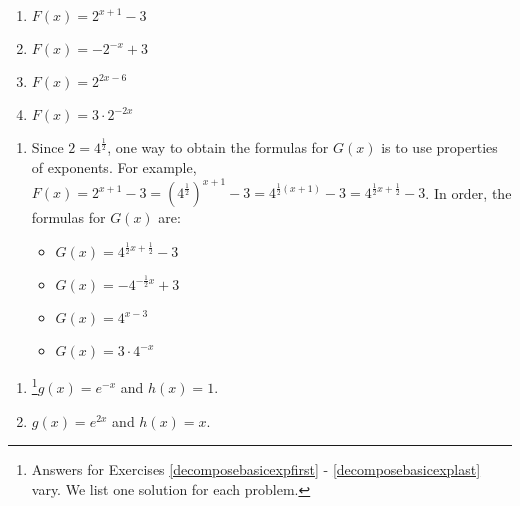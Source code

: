 \documentclass{ximera}
\begin{document}
\begin{multicols}{4}
\begin{enumerate}
\setcounter{enumi}{\value{HW}}

\item $F(x) = 2^{x+1}-3$

\item  $F(x) = -2^{-x} + 3$

\item $F(x) = 2^{2x-6}$

\item  $F(x) =3 \cdot 2^{-2x}$

\setcounter{HW}{\value{enumi}}
\end{enumerate}
\end{multicols}

\begin{enumerate}
\setcounter{enumi}{\value{HW}}

\item  Since $2 = 4^{\frac{1}{2}}$, one way to obtain the formulas for $G(x)$ is to use properties of exponents.  For example, $F(x) = 2^{x+1}-3 = \left(4^{\frac{1}{2}}\right)^{x+1} -3 = 4^{\frac{1}{2}(x+1)} - 3 = 4^{\frac{1}{2} x + \frac{1}{2}} - 3$.  In order, the formulas for $G(x)$ are:

\begin{multicols}{4}
\begin{itemize}

\item $G(x) = 4^{\frac{1}{2}x+\frac{1}{2}}-3$

\item  $G(x) = -4^{-\frac{1}{2} x} + 3$

\item $G(x) = 4^{x-3}$

\item  $G(x) =3 \cdot 4^{-x}$

\end{itemize}
\end{multicols}

\setcounter{HW}{\value{enumi}}
\end{enumerate}

\begin{multicols}{2}

\begin{enumerate}
\setcounter{enumi}{\value{HW}}

\addtocounter{enumi}{1}


\item\footnote{Answers for Exercises \ref{decomposebasicexpfirst} - \ref{decomposebasicexplast} vary.  We list one solution for each problem.}$g(x)  = e^{-x}$ and $h(x) = 1$.
\item $g(x) = e^{2x}$ and $h(x) = x$.


\setcounter{HW}{\value{enumi}}
\end{enumerate}

\end{multicols}
\end{document}
